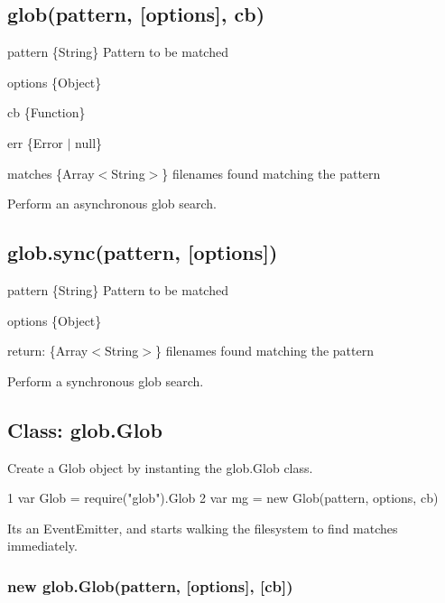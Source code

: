 \subsection*{glob(pattern, \mbox{[}options\mbox{]}, cb)}


\begin{DoxyItemize}
\item {\ttfamily pattern} \{String\} Pattern to be matched
\item {\ttfamily options} \{Object\}
\item {\ttfamily cb} \{Function\}
\begin{DoxyItemize}
\item {\ttfamily err} \{Error $\vert$ null\}
\item {\ttfamily matches} \{Array$<$\+String$>$\} filenames found matching the pattern
\end{DoxyItemize}
\end{DoxyItemize}

Perform an asynchronous glob search.

\subsection*{glob.\+sync(pattern, \mbox{[}options\mbox{]})}


\begin{DoxyItemize}
\item {\ttfamily pattern} \{String\} Pattern to be matched
\item {\ttfamily options} \{Object\}
\item return\+: \{Array$<$\+String$>$\} filenames found matching the pattern
\end{DoxyItemize}

Perform a synchronous glob search.

\subsection*{Class\+: glob.\+Glob}

Create a Glob object by instanting the {\ttfamily glob.\+Glob} class.


\begin{DoxyCode}
1 var Glob = require("glob").Glob
2 var mg = new Glob(pattern, options, cb)
\end{DoxyCode}


It\textquotesingle{}s an Event\+Emitter, and starts walking the filesystem to find matches immediately.

\subsubsection*{new glob.\+Glob(pattern, \mbox{[}options\mbox{]}, \mbox{[}cb\mbox{]})}


